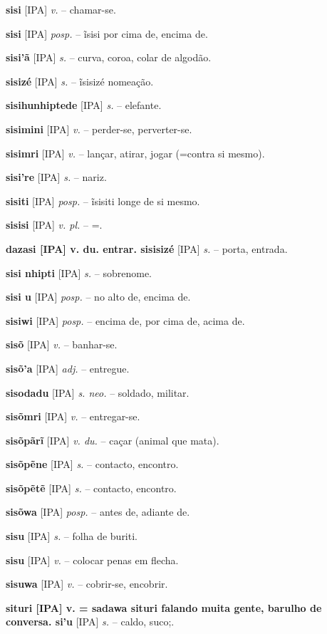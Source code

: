 \textbf{sisi} [IPA] \textit{v.} -- chamar-se.

\textbf{sisi} [IPA] \textit{posp.} -- ĩsisi por cima de, encima de.

\textbf{sisi'ã} [IPA] \textit{s.} -- curva, coroa, colar de algodão.

\textbf{sisizé} [IPA] \textit{s.} -- ĩsisizé nomeação.

\textbf{sisihunhiptede} [IPA] \textit{s.} -- elefante.

\textbf{sisimini} [IPA] \textit{v.} -- perder-se, perverter-se.

\textbf{sisimri} [IPA] \textit{v.} -- lançar, atirar, jogar (=contra si mesmo).

\textbf{sisi're} [IPA] \textit{s.} -- nariz.

\textbf{sisiti} [IPA] \textit{posp.} -- ĩsisiti longe de si mesmo.

\textbf{sisisi} [IPA] \textit{v. pl.} -- =.

\textbf{dazasi [IPA] v. du. entrar. sisisizé} [IPA] \textit{s.} -- porta, entrada.

\textbf{sisi nhipti} [IPA] \textit{s.} -- sobrenome.

\textbf{sisi u} [IPA] \textit{posp.} -- no alto de, encima de.

\textbf{sisiwi} [IPA] \textit{posp.} -- encima de, por cima de, acima de.

\textbf{sisõ} [IPA] \textit{v.} -- banhar-se.

\textbf{sisõ'a} [IPA] \textit{adj.} -- entregue.

\textbf{sisodadu} [IPA] \textit{s. neo.} -- soldado, militar.

\textbf{sisõmri} [IPA] \textit{v.} -- entregar-se.

\textbf{sisõpãrĩ} [IPA] \textit{v. du.} -- caçar (animal que mata).

\textbf{sisõpẽne} [IPA] \textit{s.} -- contacto, encontro.

\textbf{sisõpẽtẽ} [IPA] \textit{s.} -- contacto, encontro.

\textbf{sisõwa} [IPA] \textit{posp.} -- antes de, adiante de.

\textbf{sisu} [IPA] \textit{s.} -- folha de buriti.

\textbf{sisu} [IPA] \textit{v.} -- colocar penas em flecha.

\textbf{sisuwa} [IPA] \textit{v.} -- cobrir-se, encobrir.

\textbf{situri [IPA] v. = sadawa situri falando muita gente, barulho de conversa. si'u} [IPA] \textit{s.} -- caldo, suco;.

